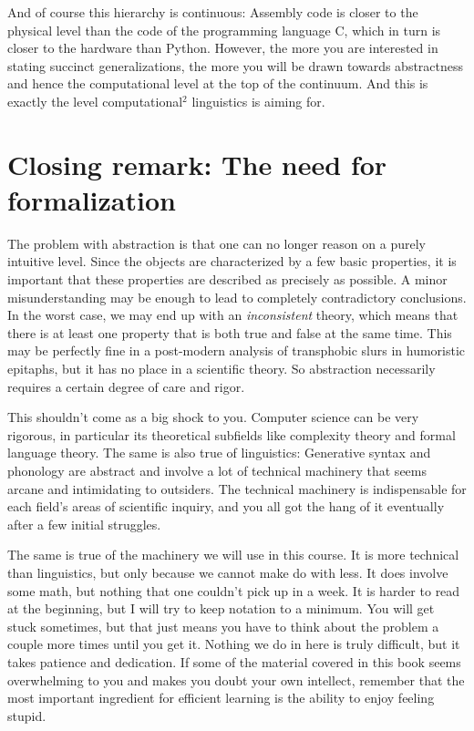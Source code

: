 And of course this hierarchy is continuous: Assembly code is closer to the physical level than the code of the programming language C, which in turn is closer to the hardware than Python.
However, the more you are interested in stating succinct generalizations, the more you will be drawn towards abstractness and hence the computational level at the top of the continuum.
And this is exactly the level computational$^2$ linguistics is aiming for.

\section{Closing remark: The need for formalization}

The problem with abstraction is that one can no longer reason on a purely intuitive level.
Since the objects are characterized by a few basic properties, it is important that these properties are described as precisely as possible.
A minor misunderstanding may be enough to lead to completely contradictory conclusions.
In the worst case, we may end up with an \emph{inconsistent} theory, which means that there is at least one property that is both true and false at the same time.
This may be perfectly fine in a post-modern analysis of transphobic slurs in humoristic epitaphs, but it has no place in a scientific theory.
So abstraction necessarily requires a certain degree of care and rigor.

This shouldn't come as a big shock to you.
Computer science can be very rigorous, in particular its theoretical subfields like complexity theory and formal language theory.
The same is also true of linguistics:
Generative syntax and phonology are abstract and involve a lot of technical machinery that seems arcane and intimidating to outsiders.
The technical machinery is indispensable for each field's areas of scientific inquiry, and you all got the hang of it eventually after a few initial struggles.

The same is true of the machinery we will use in this course.
It is more technical than linguistics, but only because we cannot make do with less.
It does involve some math, but nothing that one couldn't pick up in a week.
It is harder to read at the beginning, but I will try to keep notation to a minimum.
You will get stuck sometimes, but that just means you have to think about the problem a couple more times until you get it.
Nothing we do in here is truly difficult, but it takes patience and dedication.
If some of the material covered in this book seems overwhelming to you and makes you doubt your own intellect, remember that the most important ingredient for efficient learning is the ability to enjoy feeling stupid.

